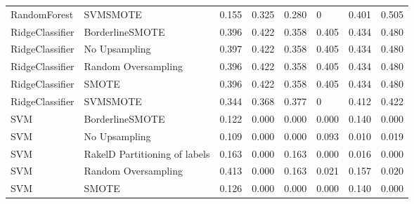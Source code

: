 \begin{tabular}{llllllll}
                   RandomForest &                      SVMSMOTE & 0.155 &                     0.325 &                 0.280 &                      0 &                                   0.401 &    0.505 \\
                RidgeClassifier &               BorderlineSMOTE & 0.396 &                     0.422 &                 0.358 &                  0.405 &                                   0.434 &    0.480 \\
                RidgeClassifier &                 No Upsampling & 0.397 &                     0.422 &                 0.358 &                  0.405 &                                   0.434 &    0.480 \\
                RidgeClassifier &           Random Oversampling & 0.396 &                     0.422 &                 0.358 &                  0.405 &                                   0.434 &    0.480 \\
                RidgeClassifier &                         SMOTE & 0.396 &                     0.422 &                 0.358 &                  0.405 &                                   0.434 &    0.480 \\
                RidgeClassifier &                      SVMSMOTE & 0.344 &                     0.368 &                 0.377 &                      0 &                                   0.412 &    0.422 \\
                            SVM &               BorderlineSMOTE & 0.122 &                     0.000 &                 0.000 &                  0.000 &                                   0.140 &    0.000 \\
                            SVM &                 No Upsampling & 0.109 &                     0.000 &                 0.000 &                  0.093 &                                   0.010 &    0.019 \\
                            SVM & RakelD Partitioning of labels & 0.163 &                     0.000 &                 0.163 &                  0.000 &                                   0.016 &    0.000 \\
                            SVM &           Random Oversampling & 0.413 &                     0.000 &                 0.163 &                  0.021 &                                   0.157 &    0.020 \\
                            SVM &                         SMOTE & 0.126 &                     0.000 &                 0.000 &                  0.000 &                                   0.140 &    0.000 \\

\end{tabular}
